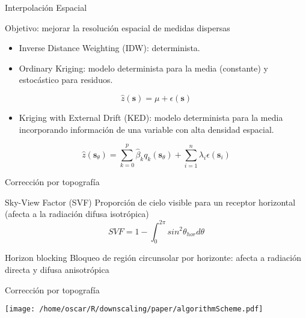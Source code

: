 \documentclass[xcolor={usenames,svgnames,dvipsnames}]{beamer}
\begin{document}
\begin{frame}[label=sec-6-1]{Interpolación Espacial}
\begin{block}{\alert{Objetivo}: mejorar la resolución espacial de medidas dispersas}
\begin{itemize}
\item \alert{Inverse Distance Weighting (IDW)}: determinista.

\item \alert{Ordinary Kriging}: modelo determinista para la media (constante) y estocástico para residuos.
\end{itemize}

\[
  \hat{z}(\mathbf{s}) = \mu + \epsilon(\mathbf{s})
\]

\begin{itemize}
\item \alert{Kriging with External Drift (KED)}: modelo determinista para la media incorporando información de una variable con alta densidad espacial.
\end{itemize}
\[  \hat{z}(\mathbf{s}_\theta) =  \sum_{k=0}^p \hat{\beta}_k q_k(\mathbf{s}_\theta) + 
  \sum_{i=1}^n \lambda_i \epsilon(\mathbf{s}_i)
\]

\nocite{Journee.Bertrand2010}
\nocite{Antonanzas-Torres.Canizares.ea2013}
\nocite{Bojanowski.Vrieling.ea2013}
\end{block}
\end{frame}

\begin{frame}[label=sec-6-2]{Corrección por topografía}
\begin{block}{Sky-View Factor (SVF)}
Proporción de cielo visible para un receptor horizontal (afecta a la radiación difusa isotrópica)
\[
SVF=1-\int_0^{2\pi}sin^{2} \theta_{hor} d\theta
\]
\end{block}
\begin{block}{Horizon blocking}
Bloqueo de región circunsolar por horizonte: afecta a radiación
directa y difusa anisotrópica
\end{block}
\end{frame}
\begin{frame}[label=sec-6-3]{Corrección por topografía}
\begin{center}
\texttt{[image: /home/oscar/R/downscaling/paper/algorithmScheme.pdf]}
\end{center}
\end{frame}
\end{document}
